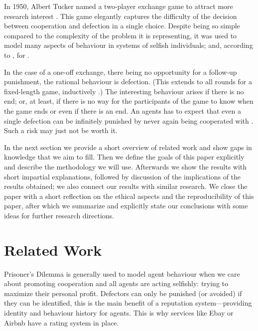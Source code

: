 \documentclass[english]{article}
\begin{document}
In 1950, Albert Tucker named a two-player exchange game
 to attract more research interest \citep{sep-prisoner-dilemma}.
This game elegantly captures the difficulty of the decision between cooperation and defection in a single choice.
Despite being so simple compared to the complexity of the problem it is representing,
it was used to model many aspects of behaviour in systems of selfish individuals;
and, according to \citet{Axelrod84}, for .

In the case of a one-off exchange, there being no opportunity for a follow-up punishment, the rational behaviour is defection.
(This extends to all rounds for a fixed-length game, inductively \citep{Axelrod84}.)
The interesting behaviour arises if there is no end; or, at least,
if there is no way for the participants of the game to know when the game ends or even if there is an end.
An agents has to expect that even a single defection can be infinitely punished by never again being cooperated with \citep{GRIM}.
Such a risk may just not be worth it.

In the next section we provide a short overview of related work and show gaps in knowledge that we aim to fill.
Then we define the goals of this paper explicitly and describe the methodology we will use.
Afterwards we show the results with short impartial explanations,
followed by discussion of the implications of the results obtained; we also connect our results with similar research.
We close the paper with a short reflection on the ethical aspects and the reproducibility of this paper,
after which we summarize and explicitly state our conclusions with some ideas for further research directions.



\section{Related Work}
Prisoner's Dilemma is generally used to model agent behaviour when we care about promoting cooperation and all agents are acting selfishly: trying to maximize their personal profit.
Defectors can only be punished (or avoided) if they can be identified,
this is the main benefit of a reputation system---providing identity and behaviour history for agents.
This is why services like Ebay or Airbnb have a rating system in place.
\end{document}
